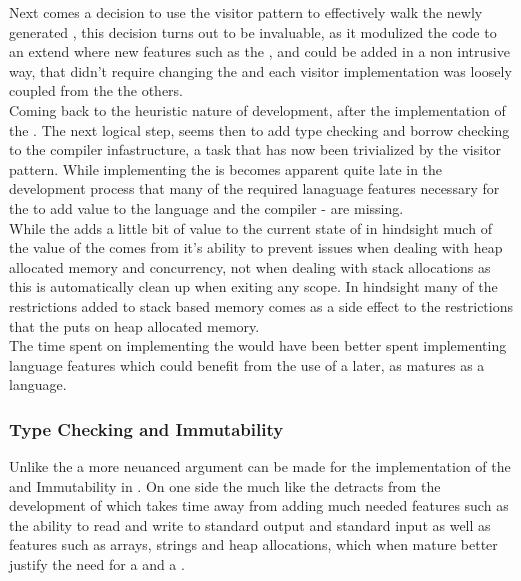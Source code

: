 Next comes a decision to use the visitor pattern to effectively walk the newly
generated \ast{}, this decision turns out to be invaluable, as it modulized the code
to an extend where new features such as the \typeChecker, \borrowChecker{} and
\codeGen{} could be added in a non intrusive way, that didn't require changing the
\ast{} and each visitor implementation was loosely coupled from the the others. \\

Coming back to the heuristic nature of development, after the implementation of the
\codeGen. The next logical step, seems then to add type checking and borrow checking
to the compiler infastructure, a task that has now been trivialized by the visitor
pattern. While implementing the \borrowChecker{} is becomes apparent quite late in
the development process that many of the required lanaguage features necessary for
the \borrowChecker{} to add value to the language and the compiler - are missing. \\

While the \borrowChecker{} adds a little bit of value to the current state of \lang{}
in hindsight much of the value of the \borrowChecker{} comes from it's ability to
prevent issues when dealing with heap allocated memory and concurrency, not when
dealing with stack allocations as this is automatically clean up when exiting any
scope. In hindsight many of the restrictions added to stack based memory comes as a side
effect to the restrictions that the \borrowChecker{} puts on heap allocated memory. \\

The time spent on implementing the \borrowChecker{} would have been better
spent implementing language features which could benefit from the use of a
\borrowChecker{} later, as \lang{} matures as a language.

\subsubsection{Type Checking and Immutability}

Unlike the \borrowChecker{} a more neuanced argument can be made for the
implementation of the \typeChecker{} and Immutability in \lang. On one side the
\typeChecker{} much like the \borrowChecker{} detracts from the development of
\lang{} which takes time away from adding much needed features such as the ability
to read and write to standard output and standard input as well as features such as
arrays, strings and heap allocations, which when mature better justify the need for a
\typeChecker{} and a \borrowChecker. \\ 

